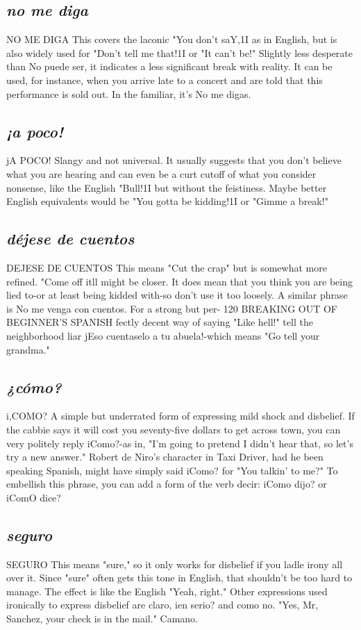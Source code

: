 \documentclass[14pt,a4paper,oneside]{memoir}
\begin{document}
\subsection{\emph{no me diga}}
NO ME DIGA
This covers the laconic "You don't saY,1I as in English, but is
also widely used for "Don't tell me that!1I or "It can't be!" Slightly less
desperate than No puede ser, it indicates a less significant break with
reality. It can be used, for instance, when you arrive late to a concert
and are told that this performance is sold out. In the familiar, it's No
me digas.
\subsection{\emph{¡a poco!}}
jA POCO!
Slangy and not universal. It usually suggests that you don't believe what you are hearing and can even be a curt cutoff of what you
consider nonsense, like the English "Bull!1I but without the feistiness.
Maybe better English equivalents would be "You gotta be kidding!1I or
"Gimme a break!"
\subsection{\emph{déjese de cuentos}}
DEJESE DE CUENTOS
This means "Cut the crap" but is somewhat more refined.
"Come off itll might be closer. It does mean that you think you are
being lied to-or at least being kidded with-so don't use it too loosely.
A similar phrase is No me venga con cuentos. For a strong but per-
120 BREAKING OUT OF BEGINNER'S SPANISH
fectly decent way of saying "Like hell!" tell the neighborhood liar jEso
cuentaselo a tu abuela!-which means "Go tell your grandma."
\subsection{\emph{¿cómo?}}
i,COMO?
A simple but underrated form of expressing mild shock and
disbelief. If the cabbie says it will cost you seventy-five dollars to get
across town, you can very politely reply iComo?-as in, "I'm going to
pretend I didn't hear that, so let's try a new answer." Robert de Niro's
character in Taxi Driver, had he been speaking Spanish, might have
simply said iComo? for "You talkin' to me?" To embellish this phrase,
you can add a form of the verb decir: iComo dijo? or iComO dice?
\subsection{\emph{seguro}}
SEGURO
This means "sure," so it only works for disbelief if you ladle
irony all over it. Since "sure" often gets this tone in English, that
shouldn't be too hard to manage. The effect is like the English "Yeah,
right." Other expressions used ironically to express disbelief are claro,
ien serio? and como no. "Yes, Mr, Sanchez, your check is in the mail."
Camano.
\end{document}
